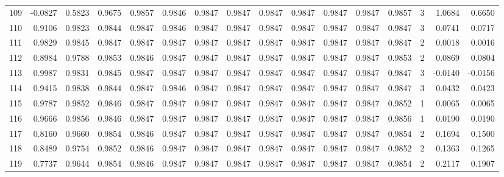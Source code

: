 \begin{tabular}{lrrrrrrrrrrrrrrr}
109 &     -0.0827 &  0.5823 &  0.9675 &  0.9857 &  0.9846 &  0.9847 &  0.9847 &  0.9847 &  0.9847 &  0.9847 &   0.9847 &     0.9857 &      3 &                    1.0684 &                     0.6650 \\
110 &      0.9106 &  0.9823 &  0.9844 &  0.9847 &  0.9846 &  0.9847 &  0.9847 &  0.9847 &  0.9847 &  0.9847 &   0.9847 &     0.9847 &      3 &                    0.0741 &                     0.0717 \\
111 &      0.9829 &  0.9845 &  0.9847 &  0.9847 &  0.9847 &  0.9847 &  0.9847 &  0.9847 &  0.9847 &  0.9847 &   0.9847 &     0.9847 &      2 &                    0.0018 &                     0.0016 \\
112 &      0.8984 &  0.9788 &  0.9853 &  0.9846 &  0.9847 &  0.9847 &  0.9847 &  0.9847 &  0.9847 &  0.9847 &   0.9847 &     0.9853 &      2 &                    0.0869 &                     0.0804 \\
113 &      0.9987 &  0.9831 &  0.9845 &  0.9847 &  0.9847 &  0.9847 &  0.9847 &  0.9847 &  0.9847 &  0.9847 &   0.9847 &     0.9847 &      3 &                   -0.0140 &                    -0.0156 \\
114 &      0.9415 &  0.9838 &  0.9844 &  0.9847 &  0.9846 &  0.9847 &  0.9847 &  0.9847 &  0.9847 &  0.9847 &   0.9847 &     0.9847 &      3 &                    0.0432 &                     0.0423 \\
115 &      0.9787 &  0.9852 &  0.9846 &  0.9847 &  0.9847 &  0.9847 &  0.9847 &  0.9847 &  0.9847 &  0.9847 &   0.9847 &     0.9852 &      1 &                    0.0065 &                     0.0065 \\
116 &      0.9666 &  0.9856 &  0.9846 &  0.9847 &  0.9847 &  0.9847 &  0.9847 &  0.9847 &  0.9847 &  0.9847 &   0.9847 &     0.9856 &      1 &                    0.0190 &                     0.0190 \\
117 &      0.8160 &  0.9660 &  0.9854 &  0.9846 &  0.9847 &  0.9847 &  0.9847 &  0.9847 &  0.9847 &  0.9847 &   0.9847 &     0.9854 &      2 &                    0.1694 &                     0.1500 \\
118 &      0.8489 &  0.9754 &  0.9852 &  0.9846 &  0.9847 &  0.9847 &  0.9847 &  0.9847 &  0.9847 &  0.9847 &   0.9847 &     0.9852 &      2 &                    0.1363 &                     0.1265 \\
119 &      0.7737 &  0.9644 &  0.9854 &  0.9846 &  0.9847 &  0.9847 &  0.9847 &  0.9847 &  0.9847 &  0.9847 &   0.9847 &     0.9854 &      2 &                    0.2117 &                     0.1907 \\

\end{tabular}

